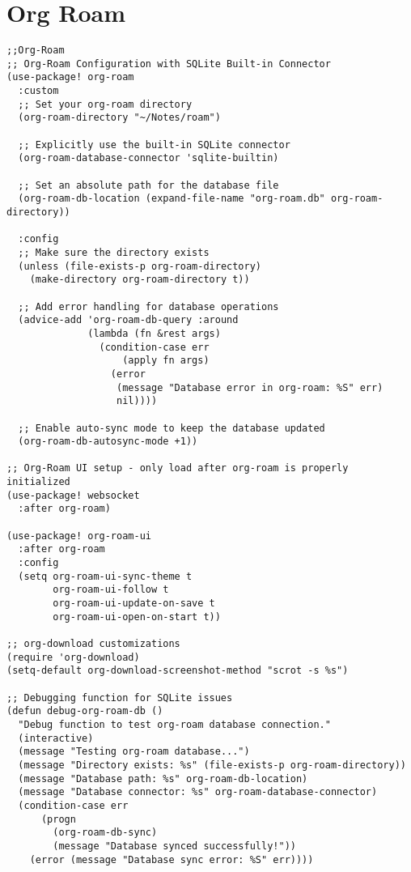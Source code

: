 \documentclass[11pt]{article}
\begin{document}
\section{Org Roam}
\label{sec:org276f1be}
\begin{verbatim}
;;Org-Roam
;; Org-Roam Configuration with SQLite Built-in Connector
(use-package! org-roam
  :custom
  ;; Set your org-roam directory
  (org-roam-directory "~/Notes/roam")

  ;; Explicitly use the built-in SQLite connector
  (org-roam-database-connector 'sqlite-builtin)

  ;; Set an absolute path for the database file
  (org-roam-db-location (expand-file-name "org-roam.db" org-roam-directory))

  :config
  ;; Make sure the directory exists
  (unless (file-exists-p org-roam-directory)
    (make-directory org-roam-directory t))

  ;; Add error handling for database operations
  (advice-add 'org-roam-db-query :around
              (lambda (fn &rest args)
                (condition-case err
                    (apply fn args)
                  (error
                   (message "Database error in org-roam: %S" err)
                   nil))))

  ;; Enable auto-sync mode to keep the database updated
  (org-roam-db-autosync-mode +1))

;; Org-Roam UI setup - only load after org-roam is properly initialized
(use-package! websocket
  :after org-roam)

(use-package! org-roam-ui
  :after org-roam
  :config
  (setq org-roam-ui-sync-theme t
        org-roam-ui-follow t
        org-roam-ui-update-on-save t
        org-roam-ui-open-on-start t))

;; org-download customizations
(require 'org-download)
(setq-default org-download-screenshot-method "scrot -s %s")

;; Debugging function for SQLite issues
(defun debug-org-roam-db ()
  "Debug function to test org-roam database connection."
  (interactive)
  (message "Testing org-roam database...")
  (message "Directory exists: %s" (file-exists-p org-roam-directory))
  (message "Database path: %s" org-roam-db-location)
  (message "Database connector: %s" org-roam-database-connector)
  (condition-case err
      (progn
        (org-roam-db-sync)
        (message "Database synced successfully!"))
    (error (message "Database sync error: %S" err))))
\end{verbatim}
\end{document}
